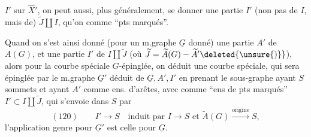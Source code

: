 $I'$ sur $\widehat X'$, on peut aussi, plus généralement, se donner une partie $I'$ (non pas de $I$, mais de) $\widetilde J\amalg I$, qu'on  comme ``pts marqués''.

Quand on s'est ainsi donné (pour un m.graphe $\underline G$ donné) une partie $A'$ de $A(G)$, et une partie $I'$ de $I\amalg\widetilde J$ (où $\widetilde J=\widetilde A(G)-\widetilde A'\deleted{\unsure{)}}$), alors pour la courbe spéciale $G$-épinglée, on déduit une courbe spéciale, qui sera épinglée par le m.graphe $\underline G'$ déduit de $\underline G,A',I'$ en prenant le sous-graphe  ayant  $S$ sommets et ayant $A'$ comme ens. d'arêtes, avec comme ``ens de pts marqués'' $I'\subset I\amalg\widetilde J$, qui s'envoie dans $S$  par
\[
(120)\qquad I'\longrightarrow S\quad\text{induit par }I\longrightarrow S\text{ et }\widetilde A(G)\xrightarrow{\text{origine}}S,
\]
l'application genre pour $\underline G'$ est celle pour $\underline G$.
